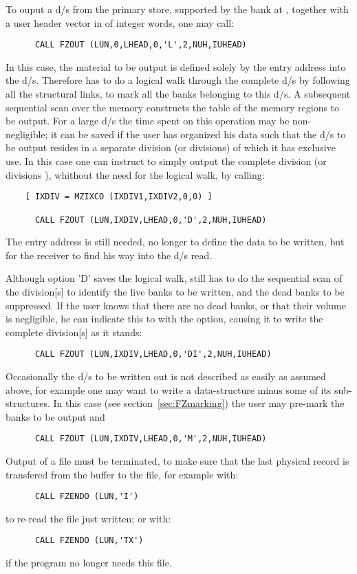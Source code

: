 To ouput a d/s from the primary store,
supported by the bank at ,
together with a user header vector in  of  integer words,
one may call:
\begin{verbatim}
      CALL FZOUT (LUN,0,LHEAD,0,'L',2,NUH,IUHEAD)
\end{verbatim}
In this case, the material to be output is defined solely by
the entry address  into the d/s.
Therefore  has to do a logical walk through the complete d/s
by following all the structural links, to mark all the banks
belonging to this d/s.
A subsequent sequential scan over the memory constructs
the table of the memory regions to be output.
For a large d/s the time spent on this operation may be
non-negligible;
it can be saved if the user has organized his data such
that the d/s to be output resides in a separate division
(or divisions) of which it has exclusive use.
In this case one can instruct  to simply
output the complete division  (or divisions ),
whithout the need for the logical walk, by calling:
\begin{verbatim}
    [ IXDIV = MZIXCO (IXDIV1,IXDIV2,0,0) ]

      CALL FZOUT (LUN,IXDIV,LHEAD,0,'D',2,NUH,IUHEAD)
\end{verbatim}
The entry address  is still needed,
no longer to define the data to be written,
but for the receiver to find his way into the d/s read.

Although option 'D' saves the logical walk,
 still has to do the sequential scan of the division[s]
to identify the live banks to be written,
and the dead banks to be suppressed.
If the user knows that there are no dead banks,
or that their volume is negligible,
he can indicate this to  with the  option,
causing it to write the complete division[s] as it stands:
\begin{verbatim}
      CALL FZOUT (LUN,IXDIV,LHEAD,0,'DI',2,NUH,IUHEAD)
\end{verbatim}

Occasionally the d/s to be written out is not described
as easily as assumed above,
for example one may want to write a data-structure
minus some of its sub-structures.
In this case (see section~\ref{sec:FZmarking}) the user may pre-mark
the banks to be output and
\begin{verbatim}
      CALL FZOUT (LUN,IXDIV,LHEAD,0,'M',2,NUH,IUHEAD)
\end{verbatim}
Output of a file must be terminated,
to make sure that the last physical record is transfered
from the buffer to the file, for example with:
\begin{verbatim}
      CALL FZENDO (LUN,'I')
\end{verbatim}
to re-read the file just written; or with:
\begin{verbatim}
      CALL FZENDO (LUN,'TX')
\end{verbatim}
if the program no longer needs this file.


